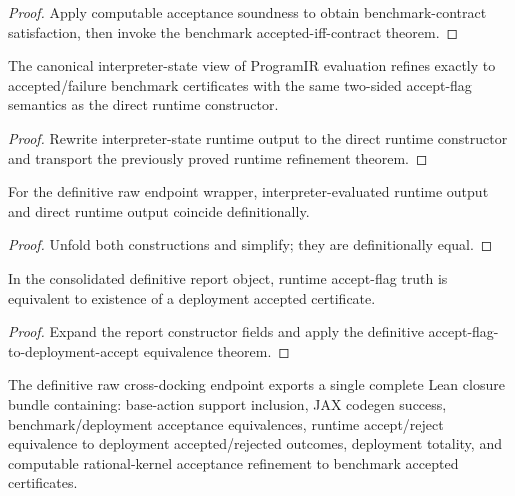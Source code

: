 \begin{proof}
Apply computable acceptance soundness to obtain benchmark-contract satisfaction, then invoke the benchmark accepted-iff-contract theorem.
\end{proof}

\begin{theorem}\label{thm:canonical-interpreter-state-runtime-refinement}
The canonical interpreter-state view of ProgramIR evaluation refines exactly to accepted/failure benchmark certificates with the same two-sided accept-flag semantics as the direct runtime constructor.
\end{theorem}

\begin{proof}
Rewrite interpreter-state runtime output to the direct runtime constructor and transport the previously proved runtime refinement theorem.
\end{proof}

\begin{theorem}\label{thm:definitive-interpreter-output-equals-runtime}
For the definitive raw endpoint wrapper, interpreter-evaluated runtime output and direct runtime output coincide definitionally.
\end{theorem}

\begin{proof}
Unfold both constructions and simplify; they are definitionally equal.
\end{proof}

\begin{theorem}\label{thm:definitive-report-runtime-accept-iff-deployment-accepted}
In the consolidated definitive report object, runtime accept-flag truth is equivalent to existence of a deployment accepted certificate.
\end{theorem}

\begin{proof}
Expand the report constructor fields and apply the definitive accept-flag-to-deployment-accept equivalence theorem.
\end{proof}

\begin{theorem}\label{thm:definitive-raw-crossdock-complete-lean-bundle}
The definitive raw cross-docking endpoint exports a single complete Lean closure bundle containing: base-action support inclusion, JAX codegen success, benchmark/deployment acceptance equivalences, runtime accept/reject equivalence to deployment accepted/rejected outcomes, deployment totality, and computable rational-kernel acceptance refinement to benchmark accepted certificates.
\end{theorem}

